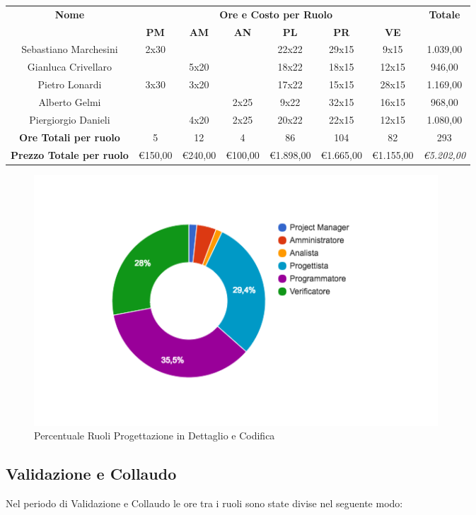 \documentclass[12pt,a4paper,titlepage]{article}
\begin{document}
	{\renewcommand\arraystretch{1.2} %
		\small
		\begin{tabular}{|c|c|c|c|c|c|c|c|}
			\hline 
			\textbf{Nome} & \multicolumn{6}{c|}{\textbf{Ore e Costo per Ruolo}} & \textbf{Totale} \\ 
			& \textbf{PM} & \textbf{AM} & \textbf{AN} & \textbf{PL} & \textbf{PR} & \textbf{VE} & \textbf{} \\ 
			\hline
			Sebastiano Marchesini & 2x30 & & & 22x22 & 29x15 & 9x15 & 1.039,00 \\ 
			\hline 
			Gianluca Crivellaro & & 5x20 & & 18x22 & 18x15 & 12x15 & 946,00 \\ 
			\hline 
			Pietro Lonardi & 3x30 & 3x20 & & 17x22 & 15x15 & 28x15 & 1.169,00 \\ 
			\hline 
			Alberto Gelmi & & & 2x25 & 9x22 & 32x15 & 16x15 & 968,00 \\ 
			\hline 
			Piergiorgio Danieli & & 4x20 & 2x25 & 20x22 & 22x15 & 12x15 & 1.080,00 \\ 
			\hline
			\hline
			\textbf{Ore Totali per ruolo} & 5 & 12 & 4 & 86 & 104 & 82 & 293 \\  
			\textbf{Prezzo Totale per ruolo}&\euro 150,00&\euro 240,00&\euro 100,00&\euro 1.898,00&\euro 1.665,00&\euro 1.155,00& \textit{\euro 5.202,00} \\
			\hline  
	\end{tabular}} 

	\begin{figure}[p]
		\centering
		\includegraphics[width=0.7\linewidth]{"CiambellaCodifica"}
		\caption{Percentuale Ruoli Progettazione in Dettaglio e Codifica}
		\label{fig:ciambella-progettazione-dettaglio-codifica}
	\end{figure} 

	
	\subsection{Validazione e Collaudo}
	Nel periodo di Validazione e Collaudo le ore tra i ruoli sono state divise nel seguente modo:
	\\
	
\end{document}
